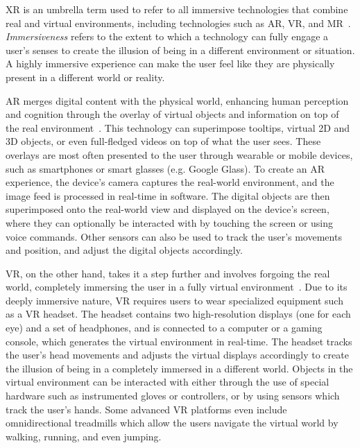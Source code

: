 \gls{XR} is an umbrella term used to refer to all immersive technologies that combine real and virtual environments, including technologies such as \gls{AR}, \gls{VR}, and \gls{MR}~\cite{doerner2022virtual}.
\emph{Immersiveness} refers to the extent to which a technology can fully engage a user's senses to create the illusion of being in a different environment or situation.
A highly immersive experience can make the user feel like they are physically present in a different world or reality.

\gls{AR} merges digital content with the physical world, enhancing human perception and cognition through the overlay of virtual objects and information on top of the real environment~\cite{doerner2022virtual}.
This technology can superimpose tooltips, virtual \gls{2D} and \gls{3D} objects, or even full-fledged videos on top of what the user sees.
These overlays are most often presented to the user through wearable or mobile devices, such as smartphones or smart glasses (e.g. Google Glass).
To create an \gls{AR} experience, the device's camera captures the real-world environment, and the image feed is processed in real-time in software.
The digital objects are then superimposed onto the real-world view and displayed on the device's screen, where they can optionally be interacted with by touching the screen or using voice commands.
Other sensors can also be used to track the user's movements and position, and adjust the digital objects accordingly.

\gls{VR}, on the other hand, takes it a step further and involves forgoing the real world, completely immersing the user in a fully virtual environment~\cite{doerner2022virtual}.
Due to its deeply immersive nature, \gls{VR} requires users to wear specialized equipment such as a \gls{VR} headset.
The headset contains two high-resolution displays (one for each eye) and a set of headphones, and is connected to a computer or a gaming console, which generates the virtual environment in real-time.
The headset tracks the user's head movements and adjusts the virtual displays accordingly to create the illusion of being in a completely immersed in a different world.
Objects in the virtual environment can be interacted with either through the use of special hardware such as instrumented gloves or controllers, or by using sensors which track the user's hands.
Some advanced \gls{VR} platforms even include omnidirectional treadmills which allow the users navigate the virtual world by walking, running, and even jumping. 

